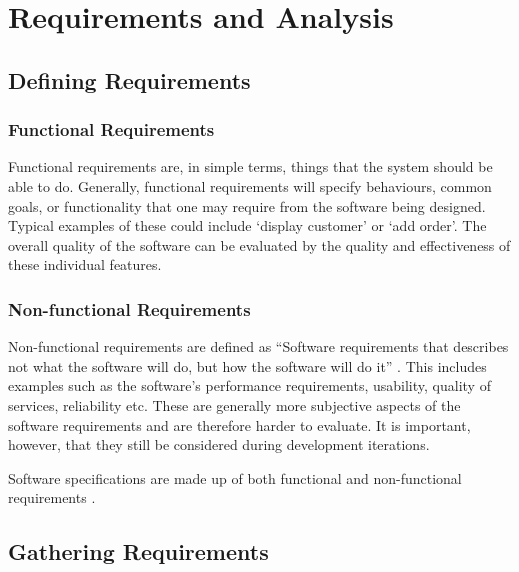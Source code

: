 \chapter{Requirements and Analysis}
\label{chap:methodology}

\section{Defining Requirements}
\subsection{Functional Requirements}
Functional requirements are, in simple terms, things that the system should be able to do. 
Generally, functional requirements will specify behaviours, common goals, or functionality that one may require from the software being designed.
Typical examples of these could include `display customer' or `add order'. 
The overall quality of the software can be evaluated by the quality and effectiveness of these individual features.

\subsection{Non-functional Requirements}
Non-functional requirements are defined as ``Software requirements that describes not what the software will do, but how the software will do it'' \citep[p.6]{chung2012non}.
This includes examples such as the software's performance requirements, usability, quality of services, reliability etc.
These are generally more subjective aspects of the software requirements and are therefore harder to evaluate. 
It is important, however, that they still be considered during development iterations.

Software specifications are made up of both functional and non-functional requirements \citep{chung2012non}. 

\section{Gathering Requirements}
